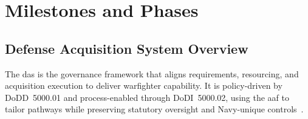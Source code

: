 \documentclass[../main.tex]{subfiles}
\begin{document}
\section{Milestones and Phases}
\minibib

\subsection{Defense Acquisition System Overview}
The \ac{das} is the governance framework that aligns requirements, resourcing, and acquisition execution to deliver warfighter capability. It is policy-driven by DoDD~5000.01 and process-enabled through DoDI~5000.02, using the \ac{aaf} to tailor pathways while preserving statutory oversight and Navy-unique controls~\autocite{DoDD5000-01,DoDI5000-02}.
\end{document}
